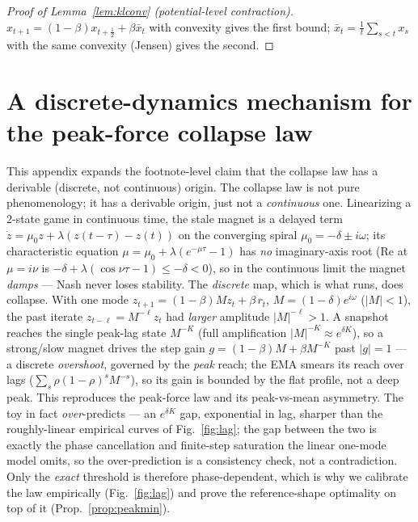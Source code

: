 \documentclass[10pt,twocolumn]{article}
\theoremstyle{plain}
\theoremstyle{remark}
\begin{document}
\begin{proof}[Proof of Lemma~\ref{lem:klconv} (potential-level contraction)]
$x_{t+1}=(1-\beta)x_{t+\frac12}+\beta\bar x_t$ with convexity gives the first bound;
$\bar x_t=\frac1t\sum_{s<t}x_s$ with the same convexity (Jensen) gives the second.
\end{proof}

\section{A discrete-dynamics mechanism for the peak-force collapse law}
\label{app:discrete}
This appendix expands the footnote-level claim that the collapse law has a derivable
(discrete, not continuous) origin.
The collapse law is not pure phenomenology; it has a derivable origin, just not a
\emph{continuous} one. Linearizing a $2$-state game in continuous time, the stale
magnet is a delayed term $\dot z=\mu_0 z+\lambda(z(t\!-\!\tau)-z(t))$ on the
converging spiral $\mu_0=-\delta\pm i\omega$; its characteristic equation
$\mu=\mu_0+\lambda(e^{-\mu\tau}-1)$ has \emph{no} imaginary-axis root
($\mathrm{Re}$ at $\mu=i\nu$ is $-\delta+\lambda(\cos\nu\tau-1)\le-\delta<0$), so in
the continuous limit the magnet \emph{damps} --- Nash never loses stability. The
\emph{discrete} map, which is what runs, does collapse. With one mode
$z_{t+1}=(1-\beta)Mz_t+\beta\,r_t$, $M=(1-\delta)e^{i\omega}$ ($|M|<1$), the past
iterate $z_{t-\ell}=M^{-\ell}z_t$ had \emph{larger} amplitude $|M|^{-\ell}\!>\!1$. A
snapshot reaches the single peak-lag state $M^{-K}$ (full amplification
$|M|^{-K}\!\approx\!e^{\delta K}$), so a strong/slow magnet drives the step gain
$g=(1-\beta)M+\beta M^{-K}$ past $|g|\!=\!1$ --- a discrete \emph{overshoot},
governed by the \emph{peak} reach; the EMA smears its reach over lags
($\sum_s\rho(1-\rho)^sM^{-s}$), so its gain is bounded by the flat profile, not a
deep peak. This reproduces the peak-force law and its peak-vs-mean asymmetry. The toy
in fact \emph{over}-predicts --- an $e^{\delta K}$ gap, exponential in lag, sharper
than the roughly-linear empirical curves of Fig.~\ref{fig:lag}; the gap between the
two is exactly the phase cancellation and finite-step saturation the linear one-mode
model omits, so the over-prediction is a consistency check, not a contradiction. Only
the \emph{exact} threshold is therefore phase-dependent, which is why we calibrate the
law empirically (Fig.~\ref{fig:lag}) and prove the reference-shape optimality on top
of it (Prop.~\ref{prop:peakmin}).
\end{document}
